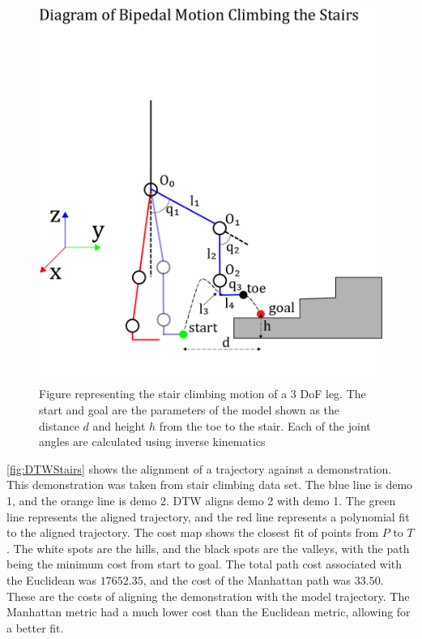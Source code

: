  
\begin{figure} 
    \centering 
    \includegraphics[scale=0.9]{images/stairs/stick.png}
    \caption[Stair Climbing Motion]{Figure representing the stair climbing motion of a 3 DoF leg. The start and goal are the parameters of the model shown as the distance $d$ and height $h$ from the toe to the stair. Each of the joint angles are calculated using inverse kinematics} 
    \label{fig:stick}
\end{figure} 

\autoref{fig:DTWStairs} shows the alignment of a trajectory against a demonstration. This demonstration was taken from stair climbing data set. The blue line is demo 1, and the orange line is demo 2. DTW aligns demo 2 with demo 1. The green line represents the aligned trajectory, and the red line represents a polynomial fit to the aligned trajectory. The cost map shows the closest fit of points from $P$ to $T$. The white spots are the hills, and the black spots are the valleys, with the path being the minimum cost from start to goal. The total path cost associated with the Euclidean was $17652.35$, and the cost of the Manhattan path was $33.50$. These are the costs of aligning the demonstration with the model trajectory. The Manhattan metric had a much lower cost than the Euclidean metric, allowing for a better fit. 

